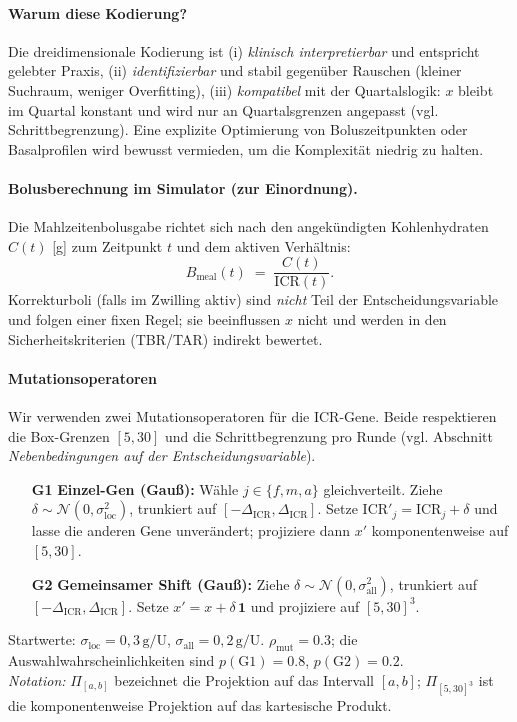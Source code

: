 \documentclass[ngerman,a4paper,12pt,pdftex]{article}
\newcommand{\ICR}{\mathrm{ICR}}
\newcommand{\DICR}{\Delta_{\mathrm{ICR}}}
\newcommand{\sigmaloc}{\sigma_{\mathrm{loc}}}
\newcommand{\sigmaall}{\sigma_{\mathrm{all}}}
\begin{document}
\paragraph{Warum diese Kodierung?}
Die dreidimensionale Kodierung ist (i) \emph{klinisch interpretierbar} und entspricht gelebter Praxis, (ii) \emph{identifizierbar} und stabil gegen\"uber Rauschen (kleiner Suchraum, weniger Overfitting), (iii) \emph{kompatibel} mit der Quartalslogik: \(x\) bleibt im Quartal konstant und wird nur an Quartalsgrenzen angepasst (vgl. Schrittbegrenzung). Eine explizite Optimierung von Boluszeitpunkten oder Basalprofilen wird bewusst vermieden, um die Komplexit\"at niedrig zu halten.

\paragraph{Bolusberechnung im Simulator (zur Einordnung).}
Die Mahlzeitenbolusgabe richtet sich nach den angek\"undigten Kohlenhydraten \(C(t)\) [g] zum Zeitpunkt \(t\) und dem aktiven Verh\"altnis: \[B_{\mathrm{meal}}(t)\;=\;\frac{C(t)}{\ICR(t)}.\] Korrekturboli (falls im Zwilling aktiv) sind \emph{nicht} Teil der Entscheidungsvariable und folgen einer fixen Regel; sie beeinflussen \(x\) nicht und werden in den Sicherheitskriterien (TBR/TAR) indirekt bewertet.


\paragraph{Mutationsoperatoren}
Wir verwenden zwei Mutationsoperatoren für die ICR-Gene. Beide respektieren die Box-Grenzen \([5,30]\) und die Schrittbegrenzung pro Runde (vgl. Abschnitt \emph{Nebenbedingungen auf der Entscheidungsvariable}).
\begin{itemize}
  \item[\textbf{G1}] \textbf{Einzel-Gen (Gauß):} Wähle \(j\in\{f,m,a\}\) gleichverteilt. Ziehe \(\delta \sim \mathcal N(0,\sigmaloc^{2})\), trunkiert auf \([-\DICR,\DICR]\). Setze \(\ICR'_j=\ICR_j+\delta\) und lasse die anderen Gene unverändert; projiziere dann \(x'\) komponentenweise auf \([5,30]\).
  \item[\textbf{G2}] \textbf{Gemeinsamer Shift (Gauß):} Ziehe \(\delta \sim \mathcal N(0,\sigmaall^{2})\), trunkiert auf \([-\DICR,\DICR]\). Setze \(x' = x + \delta\,\mathbf{1}\) und projiziere auf \([5,30]^3\).
\end{itemize}
Startwerte: \(\sigmaloc=0{,}3\,\mathrm{g/U}\), \(\sigmaall=0{,}2\,\mathrm{g/U}\).
\(\rho_{\mathrm{mut}}=0.3\); die Auswahlwahrscheinlichkeiten sind \(p(\text{G1})=0.8\), \(p(\text{G2})=0.2\).\\
\emph{Notation:} \(\Pi_{[a,b]}\) bezeichnet die Projektion auf das Intervall \([a,b]\); \(\Pi_{[5,30]^3}\) ist die komponentenweise Projektion auf das kartesische Produkt.
\end{document}
